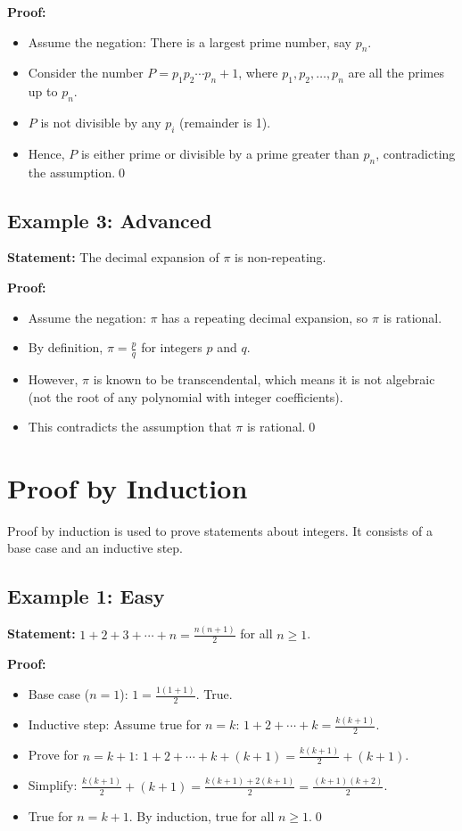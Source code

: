 \documentclass[12pt,a4paper]{article}
\begin{document}
\textbf{Proof:}
\begin{itemize}
    \item Assume the negation: There is a largest prime number, say $p_n$.
    \item Consider the number $P = p_1p_2\cdots p_n + 1$, where $p_1, p_2, \dots, p_n$ are all the primes up to $p_n$.
    \item $P$ is not divisible by any $p_i$ (remainder is 1).
    \item Hence, $P$ is either prime or divisible by a prime greater than $p_n$, contradicting the assumption.\qed
\end{itemize}

\subsection{Example 3: Advanced}
\textbf{Statement:} The decimal expansion of $\pi$ is non-repeating.

\textbf{Proof:}
\begin{itemize}
    \item Assume the negation: $\pi$ has a repeating decimal expansion, so $\pi$ is rational.
    \item By definition, $\pi = \frac{p}{q}$ for integers $p$ and $q$.
    \item However, $\pi$ is known to be transcendental, which means it is not algebraic (not the root of any polynomial with integer coefficients).
    \item This contradicts the assumption that $\pi$ is rational.\qed
\end{itemize}

\newpage

\section{Proof by Induction}
Proof by induction is used to prove statements about integers. It consists of a base case and an inductive step.

\subsection{Example 1: Easy}
\textbf{Statement:} $1 + 2 + 3 + \cdots + n = \frac{n(n+1)}{2}$ for all $n \geq 1$.

\textbf{Proof:}
\begin{itemize}
    \item Base case ($n=1$): $1 = \frac{1(1+1)}{2}$. True.
    \item Inductive step: Assume true for $n=k$: $1+2+\cdots+k = \frac{k(k+1)}{2}$.
    \item Prove for $n=k+1$: $1+2+\cdots+k+(k+1) = \frac{k(k+1)}{2} + (k+1)$.
    \item Simplify: $\frac{k(k+1)}{2} + (k+1) = \frac{k(k+1) + 2(k+1)}{2} = \frac{(k+1)(k+2)}{2}$.
    \item True for $n=k+1$. By induction, true for all $n\geq1$.\qed
\end{itemize}
\end{document}
